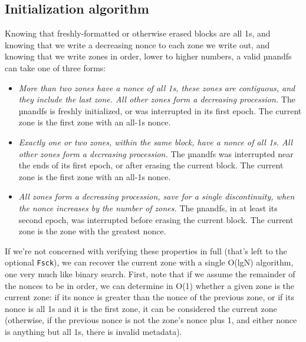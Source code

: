 \documentclass[letterpaper,10pt]{article}
\newenvironment{denseitemize}{
  \begin{itemize}
      \setlength{\itemsep}{0pt}
}{
  \end{itemize}
}
\begin{document}
\subsection{Initialization algorithm}
Knowing that freshly-formatted or otherwise erased blocks are all 1s, and
knowing that we write a decreasing nonce to each zone we write out, and knowing
that we write zones in order, lower to higher numbers, a valid µnandfs can take
one of three forms:
\begin{denseitemize}
\item \textit{More than two zones have a nonce of all 1s, these zones are
    contiguous, and they include the last zone. All other zones form a
    decreasing procession.} The µnandfs is freshly initialized, or was interrupted
    in its first epoch. The current zone is the first zone with an
    all-1s nonce.
\item \textit{Exactly one or two zones, within the same block, have a nonce of
    all 1s. All other zones form a decreasing procession.} The µnandfs was
  interrupted near the ends of its first epoch, or after erasing the current
  block.  The current zone is the first zone with an all-1s nonce.
\item \textit{All zones form a decreasing procession, save for a single discontinuity,
    when the nonce increases by the number of zones.} The µnandfs, in at least
    its second epoch, was interrupted before erasing the current block.
    The current zone is the zone with the greatest nonce.
\end{denseitemize}
If we're not concerned with verifying these properties in full (that's left to
the optional \texttt{Fsck}), we can recover the current zone with a single
O(lgN) algorithm, one very much like binary search. First, note that if we
assume the remainder of the nonces to be in order, we can determine in O(1)
whether a given zone is the current zone: if its nonce is greater than the
nonce of the previous zone, or if its nonce is all 1s and it is the first zone,
it can be considered the current zone (otherwise, if the previous nonce is not the
zone's nonce plus 1, and either nonce is anything but all 1s, there is
invalid metadata).
\end{document}
